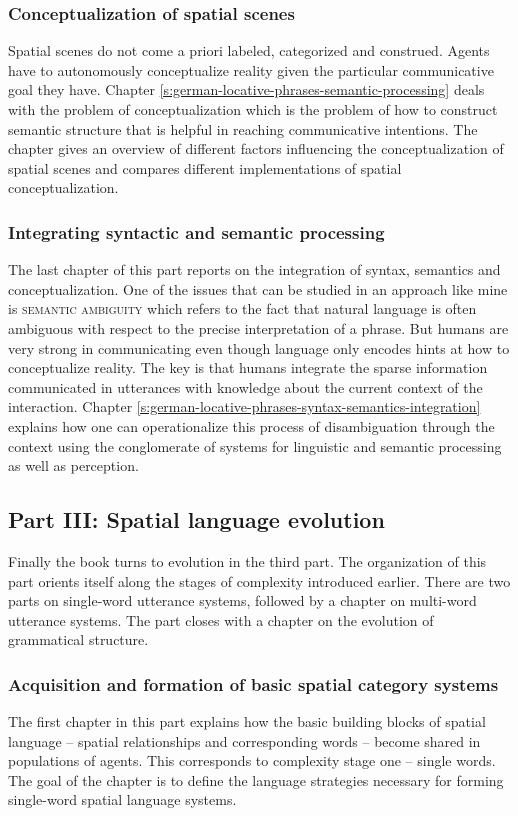 \subsubsection{Conceptualization of spatial scenes}
Spatial scenes do not come a priori labeled, categorized and construed.
Agents have to autonomously conceptualize reality given the
particular communicative goal they have. 
Chapter \ref{s:german-locative-phrases-semantic-processing} deals with the problem
of conceptualization which is the problem of how to construct semantic
structure that is helpful in reaching communicative intentions. The chapter
gives an overview of different factors influencing the conceptualization
of spatial scenes and compares different implementations of 
spatial conceptualization.

\subsubsection{Integrating syntactic and semantic processing}
The last chapter of this part reports on the integration of syntax, semantics 
and conceptualization. One of the issues that can be studied in an approach
like mine is \textsc{semantic ambiguity} which refers to the fact that natural
language is often ambiguous with respect to the precise interpretation
of a phrase. But humans are very strong in communicating even though 
language only encodes hints at how to conceptualize reality. The key
is that humans integrate the sparse information communicated in utterances 
with knowledge about the current context of the interaction. 
Chapter \ref{s:german-locative-phrases-syntax-semantics-integration}
explains how one can operationalize this process of disambiguation through
the context using the conglomerate of systems for linguistic and semantic
processing as well as perception.



\subsection{Part III: Spatial language evolution}
Finally the book turns to evolution in the third part. The organization of this part
orients itself along the stages of complexity introduced earlier. There are two
parts on single-word utterance systems, followed by a chapter on multi-word utterance
systems. The part closes with a chapter on the evolution of grammatical structure.

\subsubsection{Acquisition and formation of basic spatial category systems} 
The first chapter in this part explains how the basic building blocks of 
spatial language -- spatial relationships and corresponding words --  
become shared in populations of agents.
This corresponds to complexity stage one -- single words. The goal of the chapter is 
to define the language strategies necessary for forming single-word spatial language systems. 

